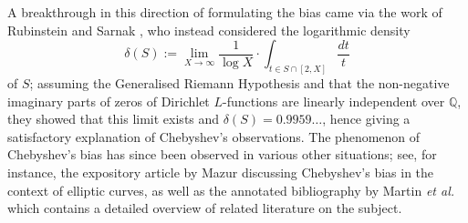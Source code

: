 \documentclass[12pt,reqno]{amsart}
\theoremstyle{definition}
\numberwithin{equation}{section}
\begin{document}
A breakthrough in this direction of formulating the bias came via the work of Rubinstein and Sarnak \cite{RubinsteinSarnak1994}, who instead considered the logarithmic density $$\delta(S):= \lim  \limits _{X \to \infty}  \frac{1}{\log X} \cdot \int_{t \in S \cap [2, X]} \frac{dt}{t}$$ of $S$; assuming the Generalised Riemann Hypothesis and that the non-negative imaginary parts of zeros of Dirichlet $L$-functions are linearly independent over $\mathbb Q$, they showed that this limit exists and $\delta(S)=0.9959 \ldots$, hence giving a satisfactory explanation of Chebyshev's observations. %
The phenomenon of Chebyshev's bias has since been observed in various other situations; see, for instance, the expository article \cite{Maz08} by Mazur  discussing Chebyshev's bias in the context of elliptic curves, as well as 
the annotated bibliography \cite{Martin} by Martin \textit{et al.} which contains a detailed overview of related literature on the subject. 












\end{document}
